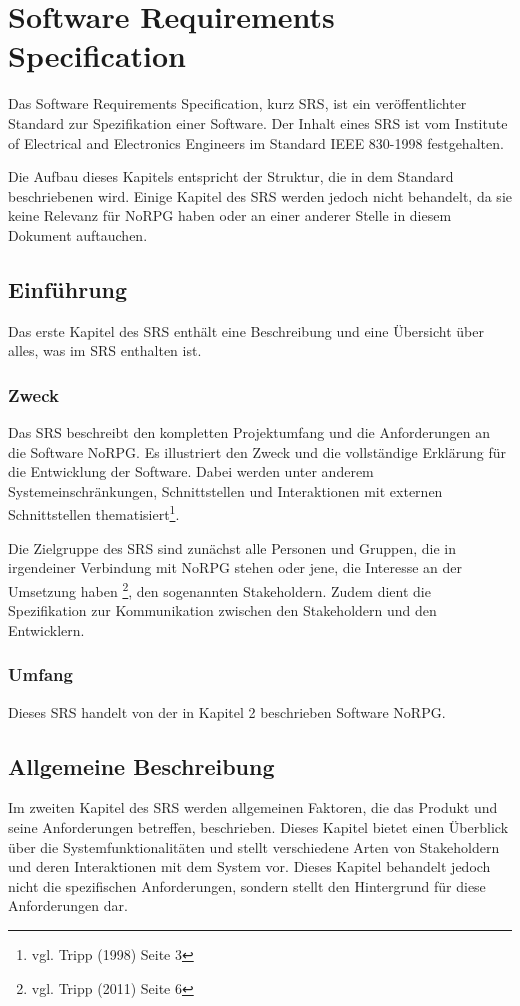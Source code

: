 \chapter{Software Requirements Specification}
	Das Software Requirements Specification, kurz SRS, ist ein veröffentlichter Standard zur Spezifikation einer Software. Der Inhalt eines SRS ist vom Institute of Electrical and Electronics Engineers im Standard IEEE 830-1998 festgehalten.
	
	Die Aufbau dieses Kapitels entspricht der Struktur, die in dem Standard beschriebenen wird. Einige Kapitel des SRS werden jedoch nicht behandelt, da sie keine Relevanz für NoRPG haben oder an einer anderer Stelle in diesem Dokument auftauchen.
	
\section{Einführung}
	Das erste Kapitel des SRS enthält eine Beschreibung und eine Übersicht über alles, was im SRS enthalten ist.
	
	\subsection{Zweck}
		Das SRS beschreibt den kompletten Projektumfang und die Anforderungen an die Software NoRPG. Es illustriert den Zweck und die vollständige Erklärung für die Entwicklung der Software. Dabei werden unter anderem Systemeinschränkungen, Schnittstellen und Interaktionen mit externen Schnittstellen thematisiert\footnote{vgl. Tripp \cite{srsIEEE}(1998) Seite 3}. 
	
		Die Zielgruppe des SRS sind zunächst alle Personen und Gruppen, die in irgendeiner Verbindung mit NoRPG stehen oder jene, die Interesse an der Umsetzung haben \footnote{vgl. Tripp \cite{rozanski2011}(2011) Seite 6}, den sogenannten Stakeholdern. Zudem dient die Spezifikation zur Kommunikation zwischen den Stakeholdern und den Entwicklern.
		
	\subsection{Umfang}
		Dieses SRS handelt von der in Kapitel 2 beschrieben Software NoRPG. 
		
\section{Allgemeine Beschreibung}
	Im zweiten Kapitel des SRS werden allgemeinen Faktoren, die das Produkt und seine Anforderungen betreffen, beschrieben. Dieses Kapitel bietet einen Überblick über die Systemfunktionalitäten und stellt verschiedene Arten von Stakeholdern und deren Interaktionen mit dem System vor. Dieses Kapitel behandelt jedoch nicht die spezifischen Anforderungen, sondern stellt den Hintergrund für diese Anforderungen dar. 

